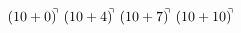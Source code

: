 \documentclass[preview]{standalone}
\begin{document}
\begin{align*}
(10+0)^{\hspace{-0.1cm}\urcorner} \ (10+4)^{\hspace{-0.1cm}\urcorner} \ (10+7)^{\hspace{-0.1cm}\urcorner} \ (10+10)^{\hspace{-0.1cm}\urcorner}
\end{align*}
\end{document}
